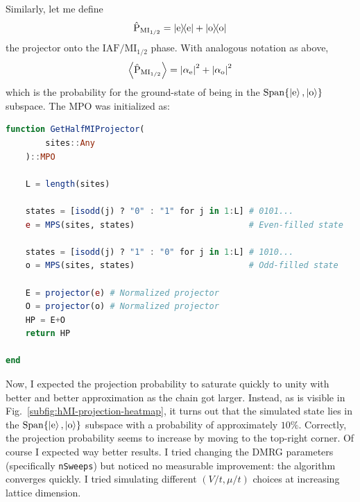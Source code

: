 Similarly, let me define 
\[
	\hat{\mathrm{P}}_{\mathrm{MI}_{1/2}} = \op{\mathrm{e}}{\mathrm{e}} + \op{\mathrm{o}}{\mathrm{o}}
\]
the projector onto the $\mathrm{IAF}/\mathrm{MI}_{1/2}$ phase. With analogous notation as above,
\[
	\ev{\hat{\mathrm{P}}_{\mathrm{MI}_{1/2}}} = \abs{\alpha_\mathrm{e}}^2  + \abs{\alpha_\mathrm{o}}^2
\]
which is the probability for the ground-state of being in the $\mathrm{Span}\lbrace \ket{\mathrm{e}}, \ket{\mathrm{o}} \rbrace$ subspace. The MPO was initialized as:
\begin{lstlisting}[language=julia]
function GetHalfMIProjector(
		sites::Any
	)::MPO
	
	L = length(sites)
	
	states = [isodd(j) ? "0" : "1" for j in 1:L] # 0101...
	e = MPS(sites, states)						 # Even-filled state
	
	states = [isodd(j) ? "1" : "0" for j in 1:L] # 1010...
	o = MPS(sites, states)						 # Odd-filled state
	
	E = projector(e) # Normalized projector
	O = projector(o) # Normalized projector
	HP = E+O
	return HP

end
\end{lstlisting}
Now, I expected the projection probability to saturate quickly to unity with better and better approximation as the chain got larger. Instead, as is visible in Fig.~\ref{subfig:hMI-projection-heatmap}, it turns out that the simulated state lies in the $\mathrm{Span}\lbrace \ket{\mathrm{e}}, \ket{\mathrm{o}} \rbrace$ subspace with a probability of approximately $10\%$. Correctly, the projection probability seems to increase by moving to the top-right corner. Of course I expected way better results. I tried changing the DMRG parameters (specifically \texttt{nSweeps}) but noticed no measurable improvement: the algorithm converges quickly. I tried simulating different $(V/t,\mu/t)$ choices at increasing lattice dimension. 

